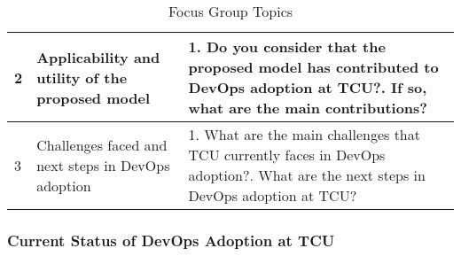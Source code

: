 {\begin{table}[hb!]
\begin{tabular}{|p{0.2cm}|p{3.4cm}|p{10cm}|}
2 & Applicability and utility of the proposed model &
1. Do you consider that the proposed model has contributed to DevOps adoption at TCU?\newline\newline
2. If so, what are the main contributions? \\ \hline

3 & Challenges faced and next steps in DevOps adoption &
1. What are the main challenges that TCU currently faces in DevOps adoption?\newline\newline
2. What are the next steps in DevOps adoption at TCU?\\ \hline

\end{tabular}
\caption{Focus Group Topics}
\label{table_topics}
\end{table}
}

\subsubsection{Current Status of DevOps Adoption at TCU}


